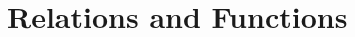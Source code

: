 \documentclass[oneside,10pt,openany,final]{book}
\begin{document}


\rule{0in}{8in}
\doclicenseThis

\frontmatter

\cleardoublepage
\titlespacing*{\chapter} {0in}{0pt}{9pt}
\tableofcontents
\titlespacing*{\chapter} {-2.125in}{0pt}{9pt}

\restoregeometry

\mainmatter
\pagestyle{fancy}

\chapter{Relations and Functions}
\chaptertoc  %
\newpage




\begin{adjustwidth}{-2in}{0in}
\titlespacing*{\chapter} {0in}{0pt}{9pt} %
\printindex
\end{adjustwidth}
\end{document}

